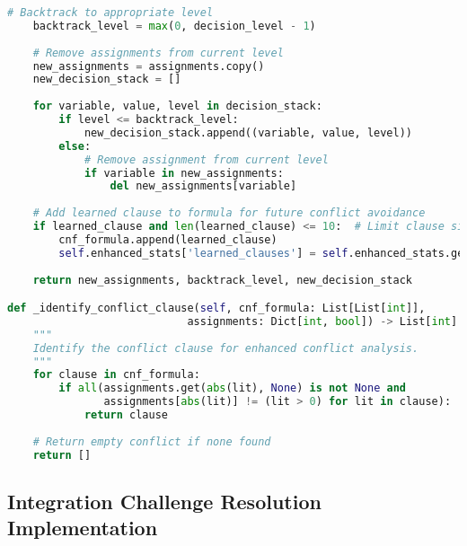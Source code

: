 \begin{lstlisting}[language=Python, caption=Robust Conflict Analysis for Consistent Performance]
    # Backtrack to appropriate level
    backtrack_level = max(0, decision_level - 1)
    
    # Remove assignments from current level
    new_assignments = assignments.copy()
    new_decision_stack = []
    
    for variable, value, level in decision_stack:
        if level <= backtrack_level:
            new_decision_stack.append((variable, value, level))
        else:
            # Remove assignment from current level
            if variable in new_assignments:
                del new_assignments[variable]
    
    # Add learned clause to formula for future conflict avoidance
    if learned_clause and len(learned_clause) <= 10:  # Limit clause size for efficiency
        cnf_formula.append(learned_clause)
        self.enhanced_stats['learned_clauses'] = self.enhanced_stats.get('learned_clauses', 0) + 1
    
    return new_assignments, backtrack_level, new_decision_stack

def _identify_conflict_clause(self, cnf_formula: List[List[int]], 
                            assignments: Dict[int, bool]) -> List[int]:
    """
    Identify the conflict clause for enhanced conflict analysis.
    """
    for clause in cnf_formula:
        if all(assignments.get(abs(lit), None) is not None and 
               assignments[abs(lit)] != (lit > 0) for lit in clause):
            return clause
    
    # Return empty conflict if none found
    return []
\end{lstlisting}

\subsection{Integration Challenge Resolution Implementation}
\label{appendix:integration-challenges}

